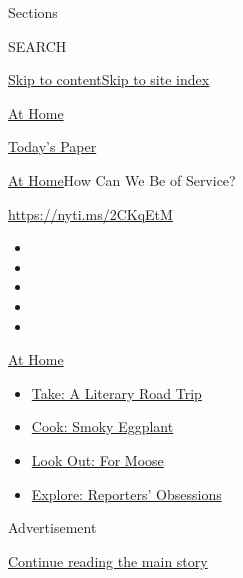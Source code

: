 Sections

SEARCH

\protect\hyperlink{site-content}{Skip to
content}\protect\hyperlink{site-index}{Skip to site index}

\href{https://www.nytimes.com/spotlight/at-home}{At Home}

\href{https://myaccount.nytimes.com/auth/login?response_type=cookie\&client_id=vi}{}

\href{https://www.nytimes.com/section/todayspaper}{Today's Paper}

\href{/spotlight/at-home}{At Home}\textbar{}How Can We Be of Service?

\url{https://nyti.ms/2CKqEtM}

\begin{itemize}
\item
\item
\item
\item
\item
\end{itemize}

\href{https://www.nytimes.com/spotlight/at-home?action=click\&pgtype=Article\&state=default\&region=TOP_BANNER\&context=at_home_menu}{At
Home}

\begin{itemize}
\tightlist
\item
  \href{https://www.nytimes.com/2020/07/28/books/time-for-a-literary-road-trip.html?action=click\&pgtype=Article\&state=default\&region=TOP_BANNER\&context=at_home_menu}{Take:
  A Literary Road Trip}
\item
  \href{https://www.nytimes.com/2020/07/29/magazine/bored-with-your-home-cooking-some-smoky-eggplant-will-fix-that.html?action=click\&pgtype=Article\&state=default\&region=TOP_BANNER\&context=at_home_menu}{Cook:
  Smoky Eggplant}
\item
  \href{https://www.nytimes.com/2020/07/27/travel/moose-michigan-isle-royale.html?action=click\&pgtype=Article\&state=default\&region=TOP_BANNER\&context=at_home_menu}{Look
  Out: For Moose}
\item
  \href{https://www.nytimes.com/interactive/2020/at-home/even-more-reporters-editors-diaries-lists-recommendations.html?action=click\&pgtype=Article\&state=default\&region=TOP_BANNER\&context=at_home_menu}{Explore:
  Reporters' Obsessions}
\end{itemize}

Advertisement

\protect\hyperlink{after-top}{Continue reading the main story}

